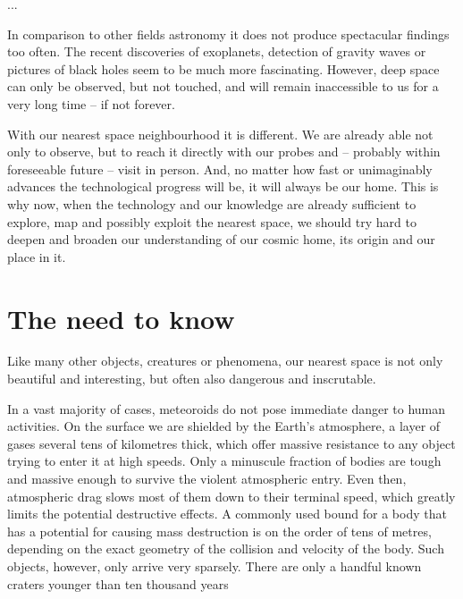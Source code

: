 

... 



In comparison to other fields astronomy it does not produce spectacular findings too often.
The recent discoveries of exoplanets, detection of gravity waves or pictures of black holes seem to be much more fascinating.
However, deep space can only be observed, but not touched, and will remain inaccessible to us for a very long time -- if not forever.

With our nearest space neighbourhood it is different. We are already able not only to observe, but to reach it directly with our probes
and -- probably within foreseeable future -- visit in person.
And, no matter how fast or unimaginably advances the technological progress will be, it will always be our home.
This is why now, when the technology and our knowledge are already sufficient to explore, map and possibly exploit
the nearest space, we should try hard to deepen and broaden our understanding of our cosmic home, its origin and our place in it.

\section{The need to know} \label{in}

    Like many other objects, creatures or phenomena, our nearest space is not only beautiful and interesting, but often
    also dangerous and inscrutable.




    In a vast majority of cases, meteoroids do not pose immediate danger to human activities.
    On the surface we are shielded by the Earth's atmosphere, a layer of gases several tens of kilometres
    thick, which offer massive resistance to any object trying to enter it at high speeds.
    Only a minuscule fraction of bodies are tough and massive enough to survive the violent atmospheric entry.
    Even then, atmospheric drag slows most of them down to their terminal speed, which greatly limits the potential destructive effects.
    A commonly used bound for a body that has a potential for causing mass destruction is on the order of tens of metres,
    depending on the exact geometry of the collision and velocity of the body. Such objects, however, only arrive very sparsely.
    There are only a handful known craters younger than ten thousand years \citep{???}

